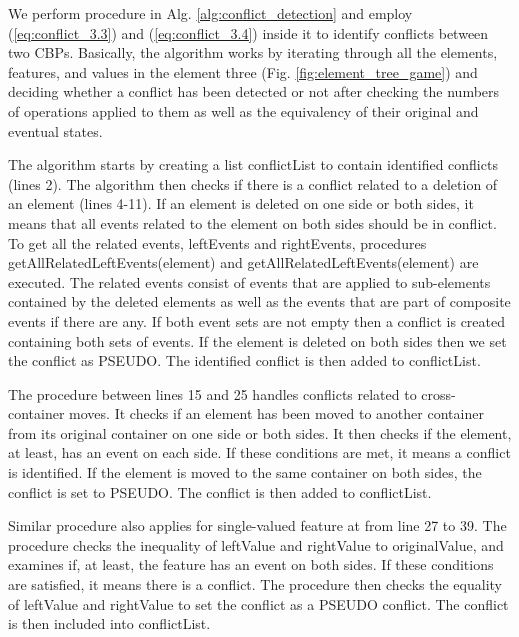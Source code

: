 We perform procedure in Alg. \ref{alg:conflict_detection} and employ (\ref{eq:conflict_3.3}) and (\ref{eq:conflict_3.4}) inside it to identify conflicts between two CBPs. Basically, the algorithm works by iterating through all the elements, features, and values in the element three (Fig. \ref{fig:element_tree_game}) and deciding whether a conflict has been detected or not after checking the numbers of operations applied to them as well as the equivalency of their original and eventual states. 

The algorithm starts by creating a list \textsf{conflictList} to contain identified conflicts (lines 2). The algorithm then checks if there is a conflict related to a deletion of an element (lines 4-11). If an element is deleted on one side or both sides, it means that all events related to the element on both sides should be in conflict. To get all the related events, \textsf{leftEvents} and \textsf{rightEvents}, procedures \textsf{getAllRelatedLeftEvents(element)} and \textsf{getAllRelatedLeftEvents(element)} are executed. The related events consist of events that are applied to sub-elements contained by the deleted elements as well as the events that are part of composite events if there are any. If both event sets are not empty then a conflict is created containing both sets of events. If the element is deleted on both sides then we set the conflict as \textsf{PSEUDO}. The identified conflict is then added to \textsf{conflictList}. 

The procedure between lines 15 and 25 handles conflicts related to cross-container moves. It checks if an element has been moved to another container from its original container on one side or both sides. It then checks if the element, at least, has an event on each side.  If these conditions are met, it means a conflict is identified. If the element is moved to the same container on both sides, the conflict is set to \textsf{PSEUDO}. The conflict is then added to \textsf{conflictList}. 

Similar procedure also applies for single-valued feature at from line 27 to 39. The procedure checks the inequality of \textsf{leftValue} and \textsf{rightValue} to \textsf{originalValue}, and examines if, at least, the feature has an event on both sides. If these conditions are satisfied, it means there is a conflict. The procedure then checks the equality of \textsf{leftValue} and \textsf{rightValue} to set the conflict as a \textsf{PSEUDO} conflict. The conflict is then included into \textsf{conflictList}.




